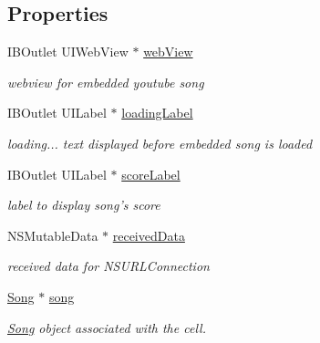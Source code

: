 \subsection*{Properties}
\begin{DoxyCompactItemize}
\item 
\hypertarget{interface_expanded_song_cell_afbd73894706a75c9fbf68d7b6ff33f6c}{I\-B\-Outlet U\-I\-Web\-View $\ast$ \hyperlink{interface_expanded_song_cell_afbd73894706a75c9fbf68d7b6ff33f6c}{web\-View}}\label{interface_expanded_song_cell_afbd73894706a75c9fbf68d7b6ff33f6c}

\begin{DoxyCompactList}\small\item\em webview for embedded youtube song \end{DoxyCompactList}\item 
\hypertarget{interface_expanded_song_cell_a2c56bbf2ac05c839c088de619aac0cd5}{I\-B\-Outlet U\-I\-Label $\ast$ \hyperlink{interface_expanded_song_cell_a2c56bbf2ac05c839c088de619aac0cd5}{loading\-Label}}\label{interface_expanded_song_cell_a2c56bbf2ac05c839c088de619aac0cd5}

\begin{DoxyCompactList}\small\item\em loading... text displayed before embedded song is loaded \end{DoxyCompactList}\item 
\hypertarget{interface_expanded_song_cell_aecc623a9c8837b2511980cb2dd331cf4}{I\-B\-Outlet U\-I\-Label $\ast$ \hyperlink{interface_expanded_song_cell_aecc623a9c8837b2511980cb2dd331cf4}{score\-Label}}\label{interface_expanded_song_cell_aecc623a9c8837b2511980cb2dd331cf4}

\begin{DoxyCompactList}\small\item\em label to display song's score \end{DoxyCompactList}\item 
\hypertarget{interface_expanded_song_cell_a376d66eecd90a802c8298102a4f3aa0e}{N\-S\-Mutable\-Data $\ast$ \hyperlink{interface_expanded_song_cell_a376d66eecd90a802c8298102a4f3aa0e}{received\-Data}}\label{interface_expanded_song_cell_a376d66eecd90a802c8298102a4f3aa0e}

\begin{DoxyCompactList}\small\item\em received data for N\-S\-U\-R\-L\-Connection \end{DoxyCompactList}\item 
\hypertarget{interface_expanded_song_cell_ae9b1ac180e8b5ae80de5cf8535d03c82}{\hyperlink{interface_song}{Song} $\ast$ \hyperlink{interface_expanded_song_cell_ae9b1ac180e8b5ae80de5cf8535d03c82}{song}}\label{interface_expanded_song_cell_ae9b1ac180e8b5ae80de5cf8535d03c82}

\begin{DoxyCompactList}\small\item\em \hyperlink{interface_song}{Song} object associated with the cell. \end{DoxyCompactList}\end{DoxyCompactItemize}



